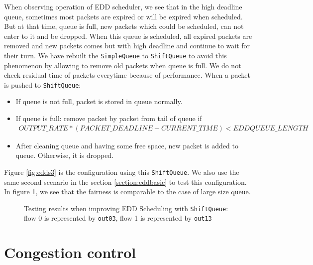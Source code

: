 \documentclass[a4paper]{article}
\begin{document}
  When observing operation of EDD scheduler, we see that in the high deadline queue, sometimes most packets are expired or will be expired when scheduled. But at that time, queue is full, new packets which could be scheduled, can not enter to it and be dropped. When this queue is scheduled, all expired packets are removed and new packets comes but with high deadline and continue to wait for their turn. We have rebuilt the \texttt{SimpleQueue} to \texttt{ShiftQueue} to avoid this phenomenon by allowing to remove old packets when queue is full. We do not check residual time of packets everytime because of performance. When a packet is pushed to \texttt{ShiftQueue}:
  \begin{itemize}
  	\item If queue is not full, packet is stored in queue normally.
  	\item If queue is full: remove packet by packet from tail of queue if 
  	\begin{align*} OUTPUT\_RATE * (PACKET\_DEADLINE - CURRENT\_TIME) < EDDQUEUE\_LENGTH \end{align*}
  	\item After cleaning queue and having some free space, new packet is added to queue. Otherwise, it is dropped.
  \end{itemize}
  Figure \ref{fig:edds3} is the configuration using this \texttt{ShiftQueue}. We also use the same second scenario in the section \ref{section:eddbasic} to test this configuration. In figure \ref{fig:test-edd3}, we see that the fairness is comparable to the case of large size queue. 
    \begin{figure}
      \centering
        \caption{Testing results when improving EDD Scheduling with \texttt{ShiftQueue}: flow 0 is represented by \texttt{out03}, flow 1 is represented by \texttt{out13}}
        \label{fig:test-edd3}
    \end{figure}
  
  \section{Congestion control}
\end{document}
